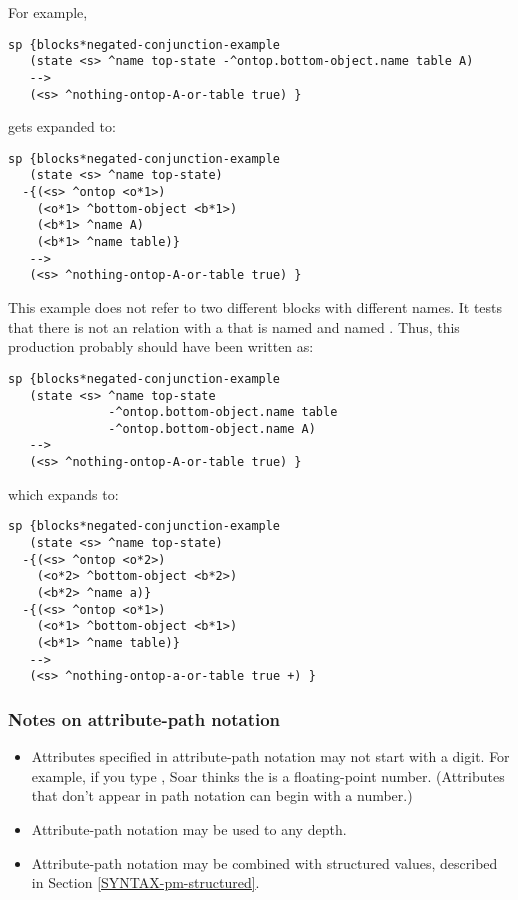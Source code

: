 For example, 

\begin{verbatim}
sp {blocks*negated-conjunction-example
   (state <s> ^name top-state -^ontop.bottom-object.name table A)
   -->
   (<s> ^nothing-ontop-A-or-table true) }
\end{verbatim}

gets expanded to:

\begin{verbatim}
sp {blocks*negated-conjunction-example
   (state <s> ^name top-state)
  -{(<s> ^ontop <o*1>)
    (<o*1> ^bottom-object <b*1>)
    (<b*1> ^name A)
    (<b*1> ^name table)}
   -->
   (<s> ^nothing-ontop-A-or-table true) }
\end{verbatim}

This example does not refer to two different blocks with different
names. It tests that there is not an  relation with a
 that is named  and named . Thus, this
production probably should have been written as:

\begin{verbatim}
sp {blocks*negated-conjunction-example
   (state <s> ^name top-state 
              -^ontop.bottom-object.name table
              -^ontop.bottom-object.name A)
   -->
   (<s> ^nothing-ontop-A-or-table true) }
\end{verbatim}

which expands to: 
\begin{verbatim}
sp {blocks*negated-conjunction-example
   (state <s> ^name top-state)
  -{(<s> ^ontop <o*2>)
    (<o*2> ^bottom-object <b*2>)
    (<b*2> ^name a)}
  -{(<s> ^ontop <o*1>)
    (<o*1> ^bottom-object <b*1>)
    (<b*1> ^name table)}
   -->
   (<s> ^nothing-ontop-a-or-table true +) }
\end{verbatim}

\subsubsection*{Notes on attribute-path notation}\vspace{-12pt}
\begin{itemize}
\item Attributes specified in attribute-path notation may not start with a
        digit. For example, if you type , Soar thinks
        the  is a floating-point number. (Attributes that don't
        appear in path notation can begin with a number.)

\item Attribute-path notation may be used to any depth.

\item Attribute-path notation may be combined with structured values,
        described in Section \ref{SYNTAX-pm-structured}.

\end{itemize}



